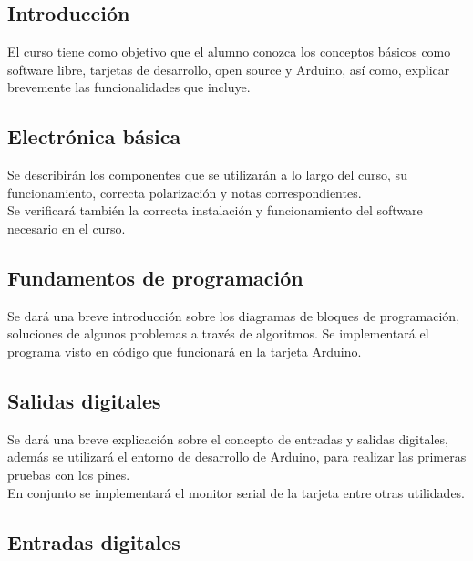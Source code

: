 \documentclass[]{article}
\begin{document}
\subsection{Introducción}\label{subcap:Intro}

El curso tiene como objetivo que el alumno conozca los conceptos básicos como software libre, tarjetas de desarrollo, open source y Arduino, así como, explicar brevemente las funcionalidades que incluye.

\subsection{Electrónica básica}\label{subcap:Ebas}

Se describirán los componentes que se utilizarán a lo largo del curso, su funcionamiento, correcta polarización y notas correspondientes.\\

Se verificará también la correcta instalación y funcionamiento del software necesario en el curso.\\

\subsection{Fundamentos de programación}\label{subcap:FunPro}

Se dará una breve introducción sobre los diagramas de bloques de programación, soluciones de algunos problemas a través de algoritmos. Se implementará el programa visto en código que funcionará en la tarjeta Arduino.\\

\subsection{Salidas digitales}\label{subcap:SalDigital}

Se dará una breve explicación sobre el concepto de entradas y salidas digitales, además se utilizará el entorno de desarrollo de Arduino, para realizar las primeras pruebas con los pines.\\

En conjunto se implementará el monitor serial de la tarjeta entre otras utilidades.\\

\subsection{Entradas digitales}\label{subcap:EntDigital}
\end{document}
